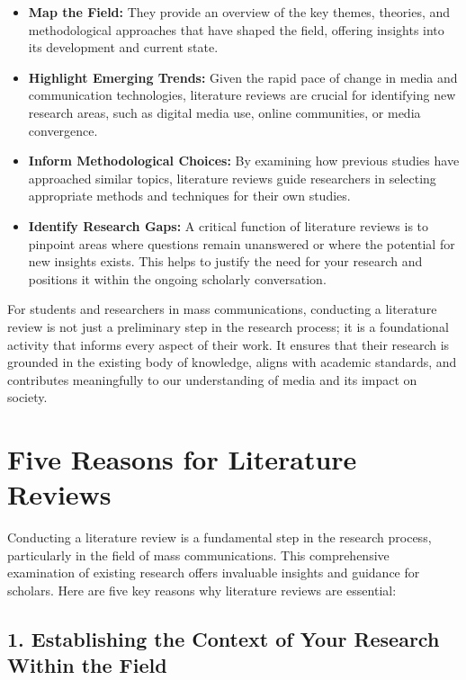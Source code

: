 \documentclass[
]{book}
\providecommand{\tightlist}{%
  \setlength{\itemsep}{0pt}\setlength{\parskip}{0pt}}
\begin{document}
\begin{itemize}
\tightlist
\item
  \textbf{Map the Field:} They provide an overview of the key themes, theories, and methodological approaches that have shaped the field, offering insights into its development and current state.
\item
  \textbf{Highlight Emerging Trends:} Given the rapid pace of change in media and communication technologies, literature reviews are crucial for identifying new research areas, such as digital media use, online communities, or media convergence.
\item
  \textbf{Inform Methodological Choices:} By examining how previous studies have approached similar topics, literature reviews guide researchers in selecting appropriate methods and techniques for their own studies.
\item
  \textbf{Identify Research Gaps:} A critical function of literature reviews is to pinpoint areas where questions remain unanswered or where the potential for new insights exists. This helps to justify the need for your research and positions it within the ongoing scholarly conversation.
\end{itemize}

For students and researchers in mass communications, conducting a literature review is not just a preliminary step in the research process; it is a foundational activity that informs every aspect of their work. It ensures that their research is grounded in the existing body of knowledge, aligns with academic standards, and contributes meaningfully to our understanding of media and its impact on society.

\hypertarget{five-reasons-for-literature-reviews}{%
\section{Five Reasons for Literature Reviews}\label{five-reasons-for-literature-reviews}}

Conducting a literature review is a fundamental step in the research process, particularly in the field of mass communications. This comprehensive examination of existing research offers invaluable insights and guidance for scholars. Here are five key reasons why literature reviews are essential:

\hypertarget{establishing-the-context-of-your-research-within-the-field}{%
\subsection*{1. Establishing the Context of Your Research Within the Field}\label{establishing-the-context-of-your-research-within-the-field}}
\end{document}
